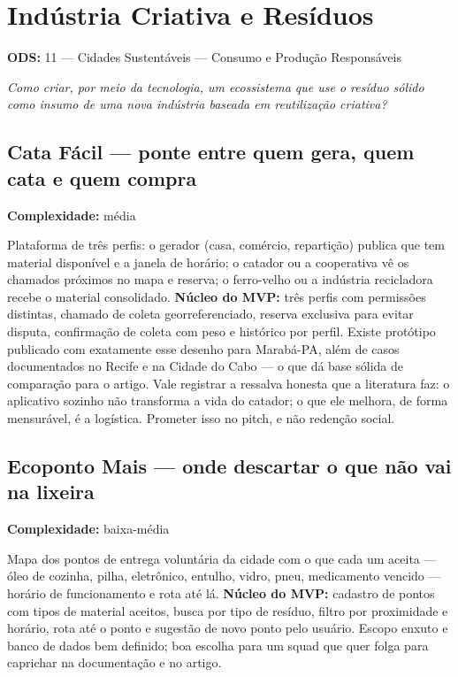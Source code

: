 \documentclass[11pt,a4paper]{article}
\newcommand{\complex}[1]{{\small\color{cinza}\textbf{Complexidade:} #1}}
\newcommand{\ods}[1]{{\small\color{verde}\textbf{ODS:} #1}}
\begin{document}
\newpage

\section{Indústria Criativa e Resíduos}
\ods{11 --- Cidades Sustentáveis  --- Consumo e Produção Responsáveis}

\emph{Como criar, por meio da tecnologia, um ecossistema que use o resíduo sólido como insumo de
uma nova indústria baseada em reutilização criativa?}

\subsection{Cata Fácil --- ponte entre quem gera, quem cata e quem compra}
\complex{média}

Plataforma de três perfis: o gerador (casa, comércio, repartição) publica que tem material
disponível e a janela de horário; o catador ou a cooperativa vê os chamados próximos no mapa e
reserva; o ferro-velho ou a indústria recicladora recebe o material consolidado. \textbf{Núcleo do
MVP:} três perfis com permissões distintas, chamado de coleta georreferenciado, reserva exclusiva
para evitar disputa, confirmação de coleta com peso e histórico por perfil. Existe protótipo
publicado com exatamente esse desenho para Marabá-PA, além de casos documentados no Recife e na
Cidade do Cabo --- o que dá base sólida de comparação para o artigo. Vale registrar a ressalva
honesta que a literatura faz: o aplicativo sozinho não transforma a vida do catador; o que ele
melhora, de forma mensurável, é a logística. Prometer isso no pitch, e não redenção social.

\subsection{Ecoponto Mais --- onde descartar o que não vai na lixeira}
\complex{baixa-média}

Mapa dos pontos de entrega voluntária da cidade com o que cada um aceita --- óleo de cozinha,
pilha, eletrônico, entulho, vidro, pneu, medicamento vencido --- horário de funcionamento e rota
até lá. \textbf{Núcleo do MVP:} cadastro de pontos com tipos de material aceitos, busca por tipo de
resíduo, filtro por proximidade e horário, rota até o ponto e sugestão de novo ponto pelo usuário.
Escopo enxuto e banco de dados bem definido; boa escolha para um squad que quer folga para caprichar
na documentação e no artigo.
\end{document}
